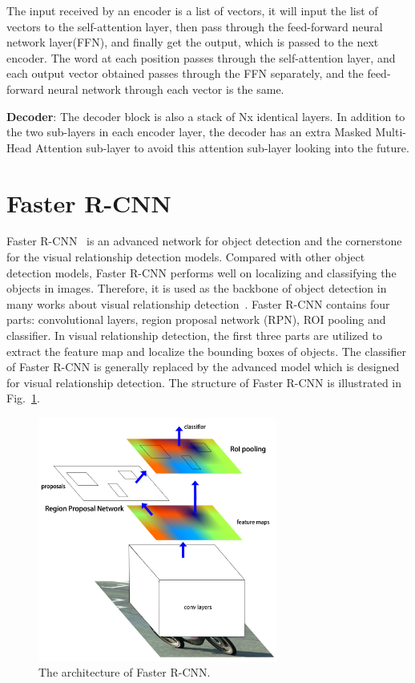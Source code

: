 The input received by an encoder is a list of vectors, it will input the list of vectors to the self-attention layer, then pass through the feed-forward neural network layer(FFN), and finally get the output, which is passed to the next encoder. The word at each position passes through the self-attention layer, and each output vector obtained passes through the FFN separately, and the feed-forward neural network through each vector is the same.


\textbf{Decoder}: The decoder block is also a stack of Nx identical layers. In addition to the two sub-layers in each encoder layer, the decoder has an extra Masked Multi-Head Attention sub-layer to avoid this attention sub-layer looking into the future.


\section{Faster R-CNN}

Faster R-CNN~\cite{ren2016faster} is an advanced network for object detection and the cornerstone for the visual relationship detection models. Compared with other object detection models, Faster R-CNN performs well on localizing and classifying the objects in images. Therefore, it is used as the backbone of object detection in many works about visual relationship detection~\cite{zellers2018neural}. Faster R-CNN contains four parts: convolutional layers, region proposal network (RPN), ROI pooling and classifier. In visual relationship detection, the first three parts are utilized to extract the feature map and localize the bounding boxes of objects. The classifier of Faster R-CNN is generally replaced by the advanced model which is designed for visual relationship detection. The structure of Faster R-CNN is illustrated in Fig.~\ref{fig:fasterrcnn}.

\begin{figure}[!htbp]
	\centering
	\includegraphics[width = 0.7\textwidth]{figures/fasterrcnn.png}
	\caption[The architecture of Faster R-CNN]
	{ The architecture of Faster R-CNN.}
	\label{fig:fasterrcnn}
\end{figure}

